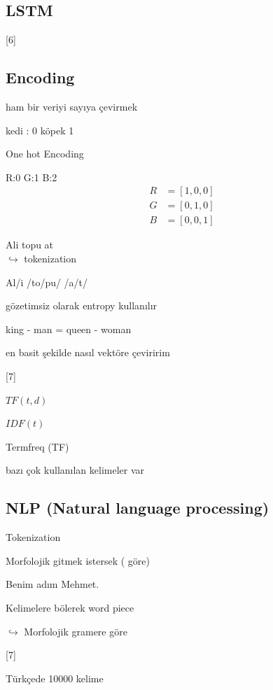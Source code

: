 \documentclass[11pt,a4paper]{article}
\begin{document}
\subsection{LSTM}

[6]

\subsection{Encoding}

ham bir veriyi sayıya çevirmek

kedi : 0 \quad köpek 1

One hot Encoding

R:0 \quad G:1 \quad B:2
\begin{align*}
R&=[1,0,0]\\
G&=[0,1,0]\\
B&=[0,0,1]
\end{align*}

Ali topu at\\
$\hookrightarrow$ tokenization

Al/i /to/pu/ /a/t/

gözetimsiz olarak entropy kullanılır

king - man = queen - woman

en basit şekilde nasıl vektöre çeviririm

[7]


$TF(t,d)$

$IDF(t)$

Termfreq (TF)

bazı çok kullanılan kelimeler var

\subsection{NLP (Natural language processing)}

Tokenization

Morfolojik gitmek istersek ( göre)

Benim adım Mehmet.

Kelimelere bölerek word piece

$\hookrightarrow$ Morfolojik gramere göre

[7]

Türkçede 10000 kelime
\end{document}
